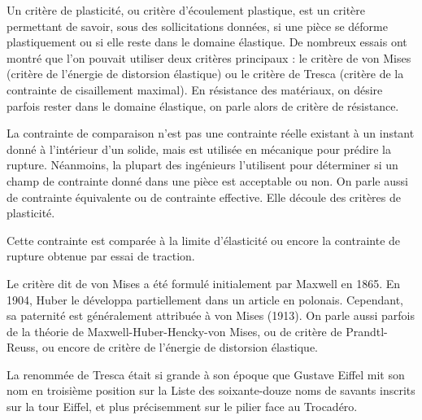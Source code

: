 \begin{histoire}
Un critère de plasticité, ou critère d'écoulement plastique, est un critère permettant de savoir, sous des sollicitations données, 
si une pièce se déforme plastiquement ou si elle reste dans le domaine élastique. 
De nombreux essais ont montré que l'on pouvait utiliser deux critères principaux : le critère de von Mises 
(critère de l'énergie de distorsion élastique) ou le critère de Tresca  
(critère de la contrainte de cisaillement maximal).
En résistance des matériaux, on désire parfois rester dans le domaine élastique, on parle alors de critère de résistance.

La contrainte de comparaison n'est pas une contrainte réelle existant à un instant donné à l'intérieur d'un solide, mais est utilisée 
en mécanique pour prédire la rupture. Néanmoins, la plupart des ingénieurs l'utilisent pour déterminer si un champ de contrainte 
donné dans une pièce est acceptable ou non. On parle aussi de contrainte équivalente ou de contrainte effective. Elle découle des 
critères de plasticité.

Cette contrainte est comparée à la limite d'élasticité ou encore la contrainte de rupture obtenue par essai de traction.

\medskip
Le critère dit de von Mises 
a été formulé initialement par Maxwell en 1865. 
En 1904, Huber le développa partiellement dans un 
article en polonais. 
Cependant, sa paternité est généralement attribuée à von Mises (1913).
On parle aussi parfois de la théorie de Maxwell-Huber-Hencky-von Mises, 
ou de critère de Prandtl-Reuss,
ou encore de critère de l'énergie de distorsion élastique.

\medskip
La renommée de Tresca 
était si grande à son époque que Gustave Eiffel 
mit son nom en troisième  position sur la Liste des soixante-douze noms de savants inscrits sur la tour Eiffel,
et plus précisemment sur le pilier face au Trocadéro.


\end{histoire}
